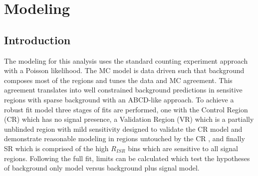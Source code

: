 \setcounter{secnumdepth}{3}
\setcounter{tocdepth}{3}
\setlength{\parskip}{\smallskipamount}
\setlength{\parindent}{0pt}


\makeatletter


\providecommand{\tabularnewline}{\\}


\makeatother

\chapter{Modeling}

\section{Introduction}
The modeling for this analysis uses the standard counting experiment approach with a Poisson likelihood. The MC model is data driven such that background composes most of the regions and tunes the data and MC agreement. This agreement translates into well constrained background predictions in sensitive regions with sparse background with an ABCD-like approach. To achieve a robust fit model three stages of fits are performed, one with the Control Region (CR) which has no signal presence, a Validation Region (VR) which is a partially unblinded region with mild sensitivity designed to validate the CR model and demonstrate reasonable modeling in regions untouched by the CR , and finally SR which is comprised of the high $R_{ISR}$ bins which are sensitive to all signal regions. Following the full fit, limits can be calculated which test the hypotheses of background only model versus background plus signal model. 


